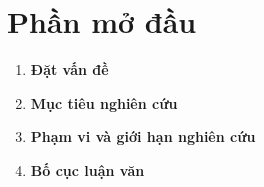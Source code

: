 \documentclass[a4paper,12pt]{report}
\begin{document}


\newpage


\newpage


\newpage

% 

\renewcommand{\contentsname}{Mục Lục}
\tableofcontents
\newpage

\renewcommand{\listtablename}{Danh sách bảng}
\listoftables
\newpage

\renewcommand{\listfigurename}{Danh sách hình}
\listoffigures
\newpage
\chapter{Phần mở đầu}
\begin{enumerate}[
    leftmargin=2.5em,
    labelsep=0.8em,
    itemsep=0.6em
]
  \renewcommand{\labelenumi}{\textcolor{chaptercolor}{\bfseries \thechapter.\arabic{enumi}}}

  \item \textbf{Đặt vấn đề}
  \item \textbf{Mục tiêu nghiên cứu}
  \item \textbf{Phạm vi và giới hạn nghiên cứu}
  \item \textbf{Bố cục luận văn}
\end{enumerate}
\newpage


% 
  
\end{document}
